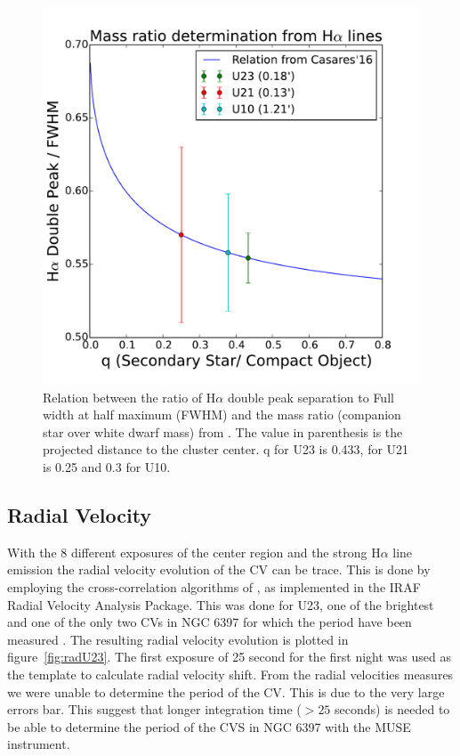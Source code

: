 \begin{figure}[h]
        \centering
        \includegraphics[scale=.5]{assets/images/mass.pdf}
\caption{Relation between the ratio of H$\alpha$ double peak separation to Full width at half maximum (FWHM) and the mass ratio (companion star over white dwarf mass) from \cite{casares_massration_20016}. The value in parenthesis is the projected distance to the cluster center. q for U23 is 0.433, for U21 is 0.25 and 0.3 for U10.}
\label{fig:mass}
\end{figure}

\subsection{Radial Velocity}

With the 8 different exposures of the center region and the strong H$\alpha$ line emission the radial velocity evolution of the CV can be trace. This is done by employing the cross-correlation algorithms of \cite{tonry_cross_1979}, as implemented in the IRAF Radial Velocity Analysis Package. This was done for U23, one of the brightest and one of the only two CVs in NGC 6397 for which the period have been measured \citep{kaluzny_time_2003}. The resulting radial velocity evolution is plotted in figure~\ref{fig:radU23}. The first exposure of 25 second for the first night was used as the template to calculate radial velocity shift. From the radial velocities measures we were unable to determine the period of the CV. This is due to the very large  errors bar. This suggest that longer integration time ($> 25$ seconds) is needed to be able to determine the period of the CVS in NGC 6397 with the MUSE instrument.   



